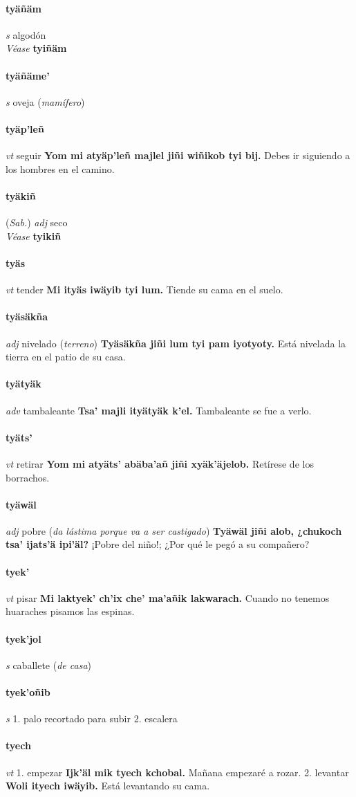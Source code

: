 \documentclass{scrbook}
\newcommand{\entry}[1]{\paragraph{#1}}
\newcommand{\onedefinition}[1]{#1.}
\newcommand{\partofspeech}[1]{\textit{#1}}
\newcommand{\spanishtranslation}[1]{#1}
\newcommand{\clarification}[1]{(\textit{#1})}
\newcommand{\cholexample}[1]{\textbf{#1}}
\newcommand{\exampletranslation}[1]{#1}
\newcommand{\alsosee}[1]{\\\textit{Véase} \textbf{#1}}
\newcommand{\relevantdialect}[1]{(\textit{#1})}
\begin{document}
\begin{multicols}{2}
\entry{tyäñäm}
\partofspeech{s}
\spanishtranslation{algodón}
\alsosee{tyiñäm}

\entry{tyäñäme'}
\partofspeech{s}
\spanishtranslation{oveja}
\clarification{mamífero}

\entry{tyäp'leñ}
\partofspeech{vt}
\spanishtranslation{seguir}
\cholexample{Yom mi atyäp'leñ majlel jiñi wiñikob tyi bij.}
\exampletranslation{Debes ir siguiendo a los hombres en el camino.}

\entry{tyäkiñ}
\relevantdialect{Sab.}
\partofspeech{adj}
\spanishtranslation{seco}
\alsosee{tyikiñ}

\entry{tyäs}
\partofspeech{vt}
\spanishtranslation{tender}
\cholexample{Mi ityäs iwäyib tyi lum.}
\exampletranslation{Tiende su cama en el suelo.}

\entry{tyäsäkña}
\partofspeech{adj}
\spanishtranslation{nivelado}
\clarification{terreno}
\cholexample{Tyäsäkña jiñi lum tyi pam iyotyoty.}
\exampletranslation{Está nivelada la tierra en el patio de su casa.}

\entry{tyätyäk}
\partofspeech{adv}
\spanishtranslation{tambaleante}
\cholexample{Tsa' majli ityätyäk k'el.}
\exampletranslation{Tambaleante se fue a verlo.}

\entry{tyäts'}
\partofspeech{vt}
\spanishtranslation{retirar}
\cholexample{Yom mi atyäts' abäba'añ jiñi xyäk'äjelob.}
\exampletranslation{Retírese de los borrachos.}

\entry{tyäwäl}
\partofspeech{adj}
\spanishtranslation{pobre}
\clarification{da lástima porque va a ser castigado}
\cholexample{Tyäwäl jiñi alob, ¿chukoch tsa' ijats'ä ipi'äl?}
\exampletranslation{¡Pobre del niño!; ¿Por qué le pegó a su compañero?}

\entry{tyek'}
\partofspeech{vt}
\spanishtranslation{pisar}
\cholexample{Mi laktyek' ch'ix che' ma'añik lakwarach.}
\exampletranslation{Cuando no tenemos huaraches pisamos las espinas.}

\entry{tyek'jol}
\partofspeech{s}
\spanishtranslation{caballete}
\clarification{de casa}

\entry{tyek'oñib}
\partofspeech{s}
\onedefinition{1}
\spanishtranslation{palo recortado para subir}
\onedefinition{2}
\spanishtranslation{escalera}

\entry{tyech}
\partofspeech{vt}
\onedefinition{1}
\spanishtranslation{empezar}
\cholexample{Ijk'äl mik tyech kchobal.}
\exampletranslation{Mañana empezaré a rozar.}
\onedefinition{2}
\spanishtranslation{levantar}
\cholexample{Woli ityech iwäyib.}
\exampletranslation{Está levantando su cama.}


\end{multicols}
\end{document}
